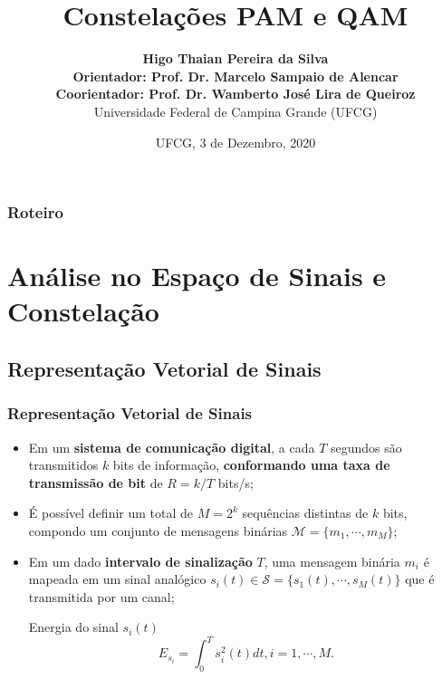 \documentclass{beamer}
\title{Constelações PAM e QAM}
\author[Silva]{\textbf{Higo Thaian Pereira da Silva \vspace{0.3cm} \\ Orientador: Prof. Dr. Marcelo Sampaio de Alencar
\vspace{0.3cm} \\ Coorientador: Prof. Dr. Wamberto José Lira de Queiroz} \vspace{0.3cm} \\ Universidade Federal de Campina Grande
(UFCG)}
\date[UFCG 2020]{UFCG, 3 de Dezembro, 2020}
\newcommand{\pag}[1] {\begin{frame}#1\end{frame}}
\begin{document}
\frame{\titlepage}

\begin{frame}
  \frametitle{Roteiro}
  \tableofcontents
\end{frame}

\section{Análise no Espaço de Sinais e Constelação}
\subsection{Representação Vetorial de Sinais}
\pag{
	\frametitle{Representação Vetorial de Sinais}
	\begin{itemize}
		\item 	Em um \textbf{sistema de comunicação digital}, a cada $T$ segundos são transmitidos $k$ bits de informação, \textbf{conformando uma taxa de transmissão de bit} de $R = k / T$ bits/s;
		\item 	É possível definir um total de $M = 2^{k}$ sequências distintas de $k$ bits, compondo um conjunto de {mensagens binárias} $\mathcal{M} = \{m_{1}, \cdots, m_{M}\}$;
		\item   Em um dado \textbf{intervalo de sinalização} $T$, uma mensagem binária $m_{i}$ é mapeada em um sinal analógico $s_{i}(t) \in \mathcal{S} = \{s_1(t),\cdots,s_{M}(t)\}$ que é transmitida por um canal;
		\begin{block}{Energia do sinal $s_{i}(t)$}
			\begin{equation}
				E_{s_{i}} = \int_{0}^{T}s_{i}^2(t)dt, i = 1,\cdots,M.
			\end{equation}
		\end{block}		
		
	\end{itemize}
}
\end{document}
